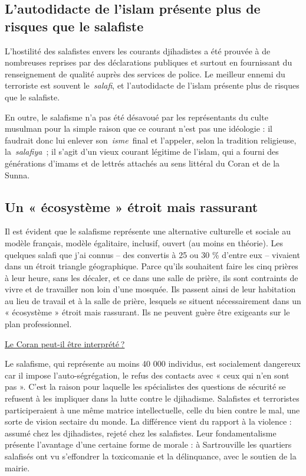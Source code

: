 \subsection{L'autodidacte de l'islam présente plus de risques que le
salafiste}

L'hostilité des salafistes envers les courants djihadistes a été prouvée
à de nombreuses reprises par des déclarations publiques et surtout en
fournissant du renseignement de qualité auprès des services de police.
Le meilleur ennemi du terroriste est souvent le~\emph{salafi}, et
l'autodidacte de l'islam présente plus de risques que le salafiste.

En outre, le salafisme n'a pas été désavoué par les représentants du
culte musulman pour la simple raison que ce courant n'est pas une
idéologie : il faudrait donc lui enlever son~\emph{isme}~final et
l'appeler, selon la tradition religieuse, la~\emph{salafiya~}; il s'agit
d'un vieux courant légitime de l'islam, qui a fourni des générations
d'imams et de lettrés attachés au sens littéral du Coran et de la Sunna.

\subsection{Un « écosystème » étroit mais rassurant}

Il est évident que le salafisme représente une alternative culturelle et
sociale au modèle français, modèle égalitaire, inclusif, ouvert (au
moins en théorie). Les quelques salafi que j'ai connus -- des convertis
à 25 ou 30 \% d'entre eux -- vivaient dans un étroit triangle
géographique. Parce qu'ils souhaitent faire les cinq prières à leur
heure, sans les décaler, et ce dans une salle de prière, ils sont
contraints de vivre et de travailler non loin d'une mosquée. Ils passent
ainsi de leur habitation au lieu de travail et à la salle de prière,
lesquels se situent nécessairement dans un « écosystème » étroit mais
rassurant. Ils ne peuvent guère être exigeants sur le plan
professionnel.

\href{https://www.la-croix.com/Religion/Le-Coran-peut-etre-interprete-2021-01-25-1201136852}{Le
Coran peut-il être interprété ?}

Le salafisme, qui représente au moins 40 000 individus, est socialement
dangereux car il impose l'auto-ségrégation, le refus des contacts avec «
ceux qui n'en sont pas ». C'est la raison pour laquelle les spécialistes
des questions de sécurité se refusent à les impliquer dans la lutte
contre le djihadisme. Salafistes et terroristes participeraient à une
même matrice intellectuelle, celle du bien contre le mal, une sorte de
vision sectaire du monde. La différence vient du rapport à la violence :
assumé chez les djihadistes, rejeté chez les salafistes. Leur
fondamentalisme présente l'avantage d'une certaine forme de morale : à
Sartrouville les quartiers salafisés ont vu s'effondrer la toxicomanie
et la délinquance, avec le soutien de la mairie.

